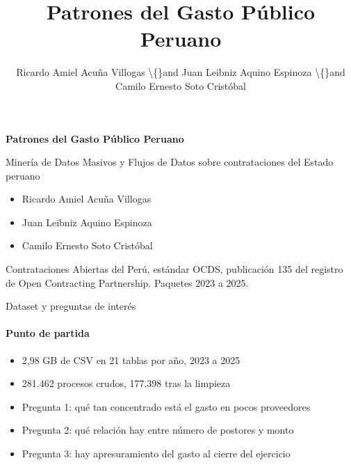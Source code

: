 \documentclass[aspectratio=169,10pt]{beamer}
\title{Patrones del Gasto Público Peruano}
\author{Ricardo Amiel Acuña Villogas \textbackslash\{\}and Juan Leibniz Aquino Espinoza \textbackslash\{\}and Camilo Ernesto Soto Cristóbal}
\date{}
\begin{document}
\begin{frame}[plain]
  \vspace{1.2em}
  {\Large\bfseries Patrones del Gasto Público Peruano\par}
  \vspace{0.9em}
  {\normalsize Minería de Datos Masivos y Flujos de Datos sobre contrataciones del Estado peruano\par}
  \vspace{1.2em}
  \begin{itemize}\setlength{\itemsep}{0.2em}
    \item Ricardo Amiel Acuña Villogas
    \item Juan Leibniz Aquino Espinoza
    \item Camilo Ernesto Soto Cristóbal
  \end{itemize}
  \vfill
  {\footnotesize Contrataciones Abiertas del Perú, estándar OCDS, publicación 135 del registro de Open Contracting Partnership. Paquetes 2023 a 2025.\par}
\end{frame}

\begin{frame}{Dataset y preguntas de interés}
  \framesubtitle{Punto de partida}
  \begin{itemize}\setlength{\itemsep}{0.7em}
    \item 2,98 GB de CSV en 21 tablas por año, 2023 a 2025
    \item 281.462 procesos crudos, 177.398 tras la limpieza
    \item Pregunta 1: qué tan concentrado está el gasto en pocos proveedores
    \item Pregunta 2: qué relación hay entre número de postores y monto
    \item Pregunta 3: hay apresuramiento del gasto al cierre del ejercicio
  \end{itemize}
\end{frame}
\end{document}
